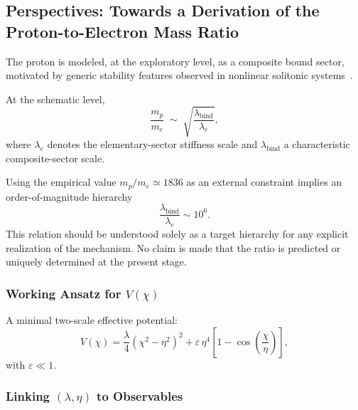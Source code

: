 \subsection{Perspectives: Towards a Derivation of the Proton-to-Electron Mass Ratio}
  \label{subsec:perspectives_mass_spectrum}

  The proton is modeled, at the exploratory level,
  as a composite bound sector,
  motivated by generic stability features observed
  in nonlinear solitonic systems~\cite{Manton2022, MantonSutcliffe2004}.

  At the schematic level,
  \begin{equation}
    \frac{m_p}{m_e}
    \;\sim\;
    \sqrt{\frac{\lambda_{\mathrm{bind}}}{\lambda_e}},
  \end{equation}
  where $\lambda_e$ denotes the elementary-sector stiffness scale
  and $\lambda_{\mathrm{bind}}$ a characteristic composite-sector scale.

  Using the empirical value $m_p/m_e \simeq 1836$
  as an external constraint implies an order-of-magnitude hierarchy
  \begin{equation}
    \frac{\lambda_{\mathrm{bind}}}{\lambda_e}
    \sim 10^{6}.
  \end{equation}
  This relation should be understood solely as a target
  hierarchy for any explicit realization of the mechanism.
  No claim is made that the ratio is predicted
  or uniquely determined at the present stage.

  \subsubsection*{Working Ansatz for $V(\chi)$}
    \label{subsec:explicit_Vchi_ansatz}

    A minimal two-scale effective potential:
    \begin{equation}
      V(\chi)
      = \frac{\lambda}{4}
      (\chi^2 - \eta^2)^2
      + \varepsilon\,\eta^4
      \left[
        1 - \cos\!\left(
                    \frac{\chi}{\eta}
      \right)
      \right],
      \label{eq:Vchi_multiwell_periodic}
    \end{equation}
    with $\varepsilon \ll 1$.

  \subsubsection*{Linking $(\lambda,\eta)$ to Observables}
    \label{subsec:lambda_eta_to_observables}

